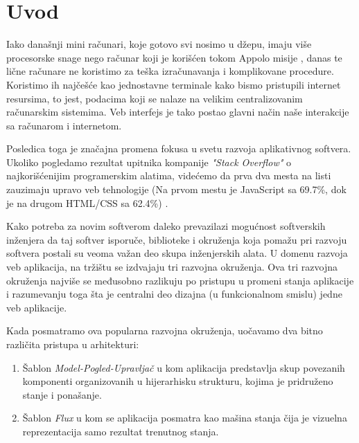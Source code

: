 \documentclass[12pt,oneside]{memoir}
\begin{document}
\frontmatter
\naslovna
\komisija
\apstrakt
\tableofcontents*

\mainmatter

\chapter{Uvod}
Iako današnji mini računari, koje gotovo svi nosimo u džepu, imaju više procesorske snage 
nego računar koji je korišćen tokom Appolo misije \cite{apollo}, 
danas te lične računare ne koristimo za teška izračunavanja i komplikovane procedure. 
Koristimo ih najčešće kao jednostavne terminale kako bismo pristupili internet resursima,
to jest, podacima koji se nalaze na velikim centralizovanim računarskim sistemima. 
Veb interfejs je tako postao glavni način naše interakcije sa računarom i internetom.

Posledica toga je značajna promena fokusa u svetu razvoja aplikativnog softvera.
Ukoliko pogledamo rezultat upitnika kompanije \emph{"Stack Overflow"}
o najkorišćenijim programerskim alatima, videćemo da prva dva mesta na listi
zauzimaju upravo veb tehnologije (Na prvom mestu je JavaScript sa 69.7\%, dok je na 
drugom HTML/CSS sa 62.4\%) \cite{StackOverflowSurvey}.

Kako potreba za novim softverom daleko prevazilazi mogućnost softverskih inženjera 
da taj softver isporuče, biblioteke i okruženja koja pomažu pri razvoju softvera 
postali su veoma važan deo skupa inženjerskih alata.
U domenu razvoja veb aplikacija, na tržištu se izdvajaju tri razvojna okruženja. 
Ova tri razvojna okruženja najviše se međusobno razlikuju po pristupu u promeni 
stanja aplikacije i razumevanju
toga šta je centralni deo dizajna (u funkcionalnom smislu) jedne veb aplikacije.

Kada posmatramo ova popularna razvojna okruženja, uočavamo dva bitno različita 
pristupa u arhitekturi:
\begin{enumerate}
  \item Šablon \emph{Model-Pogled-Upravljač} u kom aplikacija predstavlja skup
   povezanih komponenti organizovanih u hijerarhisku strukturu, kojima je 
   pridruženo stanje i ponašanje.
  \item Šablon \emph{Flux} u kom se aplikacija posmatra kao mašina stanja čija je 
  vizuelna reprezentacija samo rezultat trenutnog stanja.
\end{enumerate}
\end{document}
